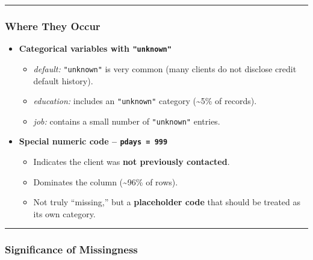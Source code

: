 \documentclass[
]{article}
\providecommand{\tightlist}{%
  \setlength{\itemsep}{0pt}\setlength{\parskip}{0pt}}
\begin{document}
\begin{center}\rule{0.5\linewidth}{0.5pt}\end{center}

\subsubsection{Where They Occur}\label{where-they-occur}

\begin{itemize}
\tightlist
\item
  \textbf{Categorical variables with \texttt{"unknown"}}

  \begin{itemize}
  \tightlist
  \item
    \emph{default:} \texttt{"unknown"} is very common (many clients do
    not disclose credit default history).\\
  \item
    \emph{education:} includes an \texttt{"unknown"} category
    (\textasciitilde5\% of records).\\
  \item
    \emph{job:} contains a small number of \texttt{"unknown"} entries.
  \end{itemize}
\item
  \textbf{Special numeric code -- \texttt{pdays\ =\ 999}}

  \begin{itemize}
  \tightlist
  \item
    Indicates the client was \textbf{not previously contacted}.\\
  \item
    Dominates the column (\textasciitilde96\% of rows).\\
  \item
    Not truly ``missing,'' but a \textbf{placeholder code} that should
    be treated as its own category.
  \end{itemize}
\end{itemize}

\begin{center}\rule{0.5\linewidth}{0.5pt}\end{center}

\subsubsection{Significance of
Missingness}\label{significance-of-missingness}
\end{document}
